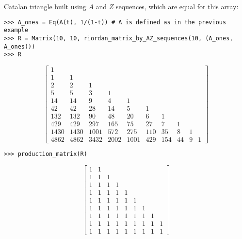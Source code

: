 \begin{example}
Catalan triangle built using $A$ and $Z$ sequences, which are equal for this array:
\begin{verbatim}
>>> A_ones = Eq(A(t), 1/(1-t)) # A is defined as in the previous example
>>> R = Matrix(10, 10, riordan_matrix_by_AZ_sequences(10, (A_ones, A_ones)))
>>> R
\end{verbatim}
\begin{displaymath}
\left[\begin{matrix}1 &   &   &   &   &   &   &   &   &  \\1 & 1 &   &   &   &   &   &   &   &  \\2 & 2 & 1 &   &   &   &   &   &   &  \\5 & 5 & 3 & 1 &   &   &   &   &   &  \\14 & 14 & 9 & 4 & 1 &   &   &   &   &  \\42 & 42 & 28 & 14 & 5 & 1 &   &   &   &  \\132 & 132 & 90 & 48 & 20 & 6 & 1 &   &   &  \\429 & 429 & 297 & 165 & 75 & 27 & 7 & 1 &   &  \\1430 & 1430 & 1001 & 572 & 275 & 110 & 35 & 8 & 1 &  \\4862 & 4862 & 3432 & 2002 & 1001 & 429 & 154 & 44 & 9 & 1\end{matrix}\right]
\end{displaymath}
\begin{verbatim}
>>> production_matrix(R)
\end{verbatim}
\begin{displaymath}
\left[\begin{matrix}1 & 1 &   &   &   &   &   &   &  \\1 & 1 & 1 &   &   &   &   &   &  \\1 & 1 & 1 & 1 &   &   &   &   &  \\1 & 1 & 1 & 1 & 1 &   &   &   &  \\1 & 1 & 1 & 1 & 1 & 1 &   &   &  \\1 & 1 & 1 & 1 & 1 & 1 & 1 &   &  \\1 & 1 & 1 & 1 & 1 & 1 & 1 & 1 &  \\1 & 1 & 1 & 1 & 1 & 1 & 1 & 1 & 1\\1 & 1 & 1 & 1 & 1 & 1 & 1 & 1 & 1\end{matrix}\right]
\end{displaymath}
\end{example}


